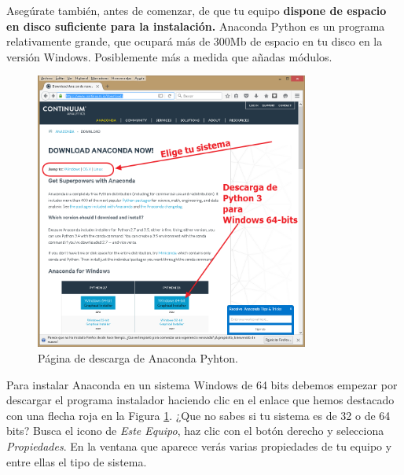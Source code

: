 \documentclass[10pt,a4paper]{article}\usepackage[]{graphicx}\usepackage[]{color}
\begin{document}
Asegúrate también, antes de comenzar, de que tu equipo {\bf dispone de espacio en disco suficiente para la instalación.} Anaconda Python es un programa relativamente grande, que ocupará más de 300Mb de espacio en tu disco en la versión Windows. Posiblemente más a medida que añadas módulos.

\begin{figure}[thb]
\begin{center}
\includegraphics[width=9cm]{../fig/Tut-00-py-01-Anaconda-a.png}
\caption{Página de descarga de Anaconda Pyhton.}
\label{cap01:fig:Tut-00-py-01-Anaconda}
\end{center}
\end{figure}

Para instalar Anaconda en un sistema Windows de 64 bits debemos empezar por descargar el programa instalador haciendo clic en el enlace que hemos destacado con una flecha roja en la Figura \ref{cap01:fig:Tut-00-py-01-Anaconda}. ¿Que no sabes si tu sistema es de 32 o de 64 bits?  Busca el icono de {\em Este Equipo}, haz clic con el botón derecho y selecciona {\em Propiedades}. En la ventana que aparece verás varias propiedades de tu equipo y entre ellas el tipo de sistema.
\end{document}
